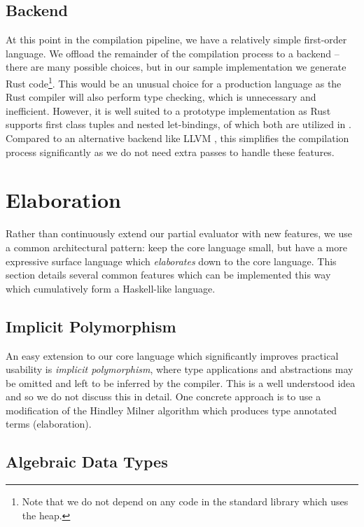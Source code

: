 \documentclass[runningheads]{llncs}
\begin{document}
\subsection{Backend}

At this point in the compilation pipeline, we have a relatively simple first-order language. We offload the remainder of the compilation process to a backend -- there are many possible choices, but in our sample implementation we generate Rust code\footnote{Note that we do not depend on any code in the standard library which uses the heap.}. This would be an unusual choice for a production language as the Rust compiler will also perform type checking, which is unnecessary and inefficient. However, it is well suited to a prototype implementation as Rust supports first class tuples and nested let-bindings, of which both are utilized in \core{}. Compared to an alternative backend like LLVM \cite{lattner2004llvm}, this simplifies the compilation process significantly as we do not need extra passes to handle these features.

\section{Elaboration} \label{sec:elaboration}

Rather than continuously extend our partial evaluator with new features, we use a common architectural pattern: keep the core language small, but have a more expressive surface language which \emph{elaborates} down to the core language. This section details several common features which can be implemented this way which cumulatively form a Haskell-like language.

\subsection{Implicit Polymorphism}

An easy extension to our core language which significantly improves practical usability is \emph{implicit polymorphism}, where type applications and abstractions may be omitted and left to be inferred by the compiler. This is a well understood idea and so we do not discuss this in detail. One concrete approach is to use a modification of the Hindley Milner algorithm \cite{milner1978theory} which produces type annotated terms (elaboration).

\subsection{Algebraic Data Types}
\end{document}
